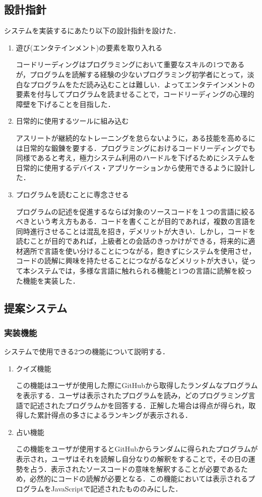 \subsection{設計指針}
システムを実装するにあたり以下の設計指針を設けた．
\begin{enumerate}
  \item 遊び(エンタテインメント)の要素を取り入れる

  コードリーディングはプログラミングにおいて重要なスキルの1つであるが，プログラムを読解する経験の少ないプログラミング初学者にとって，淡白なプログラムをただ読み込むことは難しい．よってエンタテインメントの要素を付与してプログラムを読ませることで，コードリーディングの心理的障壁を下げることを目指した．
  \item 日常的に使用するツールに組み込む

  アスリートが継続的なトレーニングを怠らないように，ある技能を高めるには日常的な鍛錬を要する．プログラミングにおけるコードリーディングでも同様であると考え，極力システム利用のハードルを下げるためにシステムを日常的に使用するデバイス・アプリケーションから使用できるように設計した．
  \item プログラムを読むことに専念させる

  プログラムの記述を促進するならば対象のソースコードを１つの言語に絞るべきという考え方もある．コードを書くことが目的であれば，複数の言語を同時進行させることは混乱を招き，デメリットが大きい．しかし，コードを読むことが目的であれば，上級者との会話のきっかけができる，将来的に適材適所で言語を使い分けることにつながる，飽きずにシステムを使用させ，コードの読解に興味を持たせることにつながるなどメリットが大きい，従って本システムでは，多様な言語に触れられる機能と1つの言語に読解を絞った機能を実装した．
\end{enumerate}

\subsection{提案システム}
\subsubsection{実装機能}
システムで使用できる2つの機能について説明する．
\begin{enumerate}
  \item クイズ機能

  この機能はユーザが使用した際にGitHubから取得したランダムなプログラムを表示する．ユーザは表示されたプログラムを読み，どのプログラミング言語で記述されたプログラムかを回答する．正解した場合は得点が得られ，取得した累計得点の多さによるランキングが表示される．

  \item 占い機能

  この機能をユーザが使用するとGitHubからランダムに得られたプログラムが表示され，ユーザはそれを読解し自分なりの解釈をすることで，その日の運勢を占う．表示されたソースコードの意味を解釈することが必要であるため，必然的にコードの読解が必要となる．この機能においては表示されるプログラムをJavaScriptで記述されたもののみにした．

\end{enumerate}
